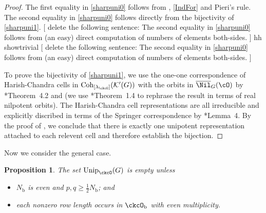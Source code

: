 \documentclass[12pt,a4paper]{amsart}
\newcommand{\trivial}[2][]{\if\relax\detokenize{#1}\relax
  {%
      \color{orange} \vspace{0em} $[$  #2 $]$
      \color{black}
  }
  \else
\ifx#1h
\ifcsname showtrivial\endcsname
{%
    \color{orange} \vspace{0em}  $[$ #2 $]$
    \color{black}
}
\fi
\else {\red Wrong argument!} \fi
\fi
}
\newcommand{\CK}{{\mathcal {K}}}
\newcommand{\oU}{\operatorname{U}}
\numberwithin{equation}{section}
\newtheorem{prop}[thm]{Proposition}
\theoremstyle{remark}
\def\half{{\tfrac{1}{2}}}
\def\Unip{\mathrm{Unip}}
\def\Cint#1{\Coh_{[#1]}}
\def\nbb{n_{\mathrm b}}
\def\Coh{\mathrm{Coh}}
\def\ckcOb{\ckcO_{\mathrm b}}
\def\Gg{G_{\mathrm g}}
\newcommand{\Lam}{{[\lambda]}}
\begin{document}
\begin{proof} The first equality  in \eqref{sharpuni0} follows from ,
  \eqref{IndFor} and Pieri's rule.
  The second equality in \eqref{sharpuni0} follows directly from
  the bijectivity of \eqref{sharpuni1}.
  \trivial[h]{
  {delete the following sentence: }
  The second equality in \eqref{sharpuni0}
  follows from (an easy) direct computation of numbers of elements both-sides.
  }
 To prove the bijectivity of \eqref{sharpuni1}, we use the one-one
  correspondence of Harish-Chandra cells in $\Cint{\lambda_\ckcO}(\CK'(G))$ with
  the orbits in $\overline \Nil_{G}(\cO)$ by \cite{BV.W}*{Theorem~4.2} and
  \cite[Theorem 5]{Bo} (we use \cite{SV}*{Theorem~1.4} to rephrase the result in
  terms of real nilpotent orbits).
  The Harish-Chandra cell representations are all irreducible and explicitly
  discribed in terms of the Springer correspondence by \cite{Bo}*{Lemma~4}.
  By the proof of , we conclude that
  there is exactly one unipotent representation attached to each
  relevent cell and therefore establish the bijection.
\end{proof}





Now we consider the general case. 

\begin{prop} \label{propu0}
The set $\Unip_{\ckcO}(G)$ is empty  unless           \begin{itemize}
            \item $N_{\mathrm b}$ is even and $p,q \geq \half N_{\mathrm b}$; and
            \item each nonzero row length occurs in $\ckcOb$ with even multiplicity.
          \end{itemize}
\end{prop}
\end{document}
